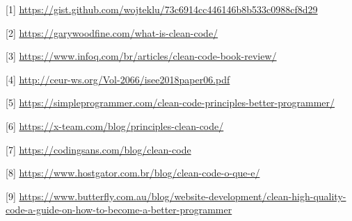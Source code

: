 \documentclass[10pt,portuguese]{article}
\begin{document}


\vspace{5mm} %

[1] \url{https://gist.github.com/wojteklu/73c6914cc446146b8b533c0988cf8d29}

[2] \url{https://garywoodfine.com/what-is-clean-code/}

[3] \url{https://www.infoq.com/br/articles/clean-code-book-review/}

[4] \url{http://ceur-ws.org/Vol-2066/isee2018paper06.pdf}

[5] \url{https://simpleprogrammer.com/clean-code-principles-better-programmer/}

[6] \url{https://x-team.com/blog/principles-clean-code/}

[7] \url{https://codingsans.com/blog/clean-code}

[8] \url{https://www.hostgator.com.br/blog/clean-code-o-que-e/}

[9] \url{https://www.butterfly.com.au/blog/website-development/clean-high-quality-code-a-guide-on-how-to-become-a-better-programmer}
\end{document}
